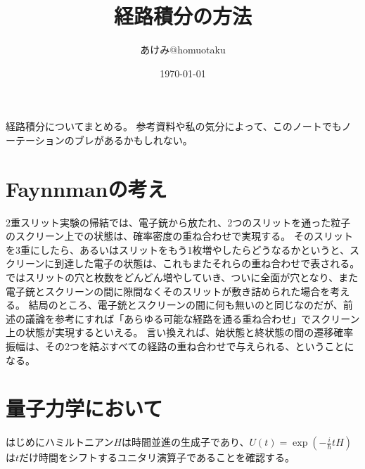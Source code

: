 \documentclass[10pt]{jsarticle}
\title{経路積分の方法}
\author{あけみ@homuotaku}
\date{\today}
\numberwithin{equation}{section}%
\begin{document}
\maketitle
経路積分についてまとめる。
参考資料や私の気分によって、このノートでもノーテーションのブレがあるかもしれない。
\tableofcontents
\section{Faynnmanの考え}
2重スリット実験の帰結では、電子銃から放たれ、2つのスリットを通った粒子のスクリーン上での状態は、確率密度の重ね合わせで実現する。
そのスリットを3重にしたら、あるいはスリットをもう1枚増やしたらどうなるかというと、スクリーンに到達した電子の状態は、これもまたそれらの重ね合わせで表される。
ではスリットの穴と枚数をどんどん増やしていき、ついに全面が穴となり、また電子銃とスクリーンの間に隙間なくそのスリットが敷き詰められた場合を考える。
結局のところ、電子銃とスクリーンの間に何も無いのと同じなのだが、前述の議論を参考にすれば「あらゆる可能な経路を通る重ね合わせ」でスクリーン上の状態が実現するといえる。
言い換えれば、始状態と終状態の間の遷移確率振幅は、その2つを結ぶすべての経路の重ね合わせで与えられる、ということになる。
\section{量子力学において}
はじめにハミルトニアン$H$は時間並進の生成子であり、$U(t)=\exp{(-\frac{i}{\hbar}tH)}$は$t$だけ時間をシフトするユニタリ演算子であることを確認する。
\end{document}
